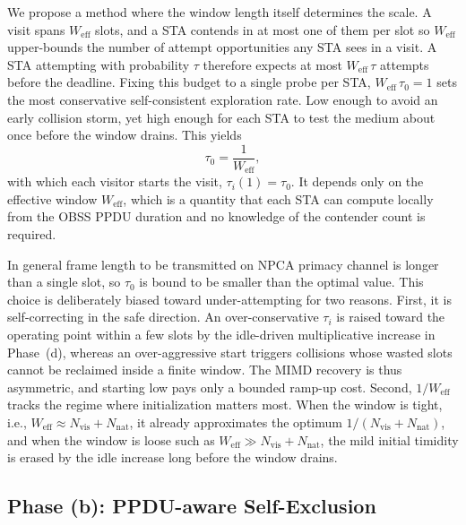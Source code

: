 \documentclass[conference]{IEEEtran}
\newcommand{\Nvis}{N_\mathrm{vis}}
\newcommand{\Nnat}{N_\mathrm{nat}}
\begin{document}
We propose a method where the window length itself determines the scale. A visit spans $W_\mathrm{eff}$ slots, and a STA contends in at most one of them per slot so $W_\mathrm{eff}$ upper-bounds the number of attempt opportunities any STA sees in a visit. A STA attempting with probability $\tau$ therefore expects at most $W_\mathrm{eff}\,\tau$ attempts before the deadline. Fixing this budget to a single probe per STA, $W_\mathrm{eff}\,\tau_0 = 1$ sets the most conservative self-consistent  exploration rate. Low enough to avoid an early collision storm, yet high enough for each STA to test the medium about once before the window drains. This yields
\begin{equation}
    \tau_0 = \frac{1}{W_\mathrm{eff}},
    \label{eq:init}
\end{equation}
with which each visitor starts the visit, $\tau_i(1)=\tau_0$. It depends only on the effective window $W_\mathrm{eff}$, which is a quantity that each STA can compute locally from the OBSS PPDU duration and no knowledge of the contender count is required.

In general frame length to be transmitted on NPCA primacy channel is longer than a single slot, so $\tau_0 $ is bound to be smaller than the optimal value. This choice is deliberately biased toward under-attempting for two reasons. First, it is self-correcting in the safe direction. An over-conservative $\tau_i$ is raised toward the operating point within a few slots by the idle-driven multiplicative increase in Phase~(d), whereas an over-aggressive start triggers collisions whose wasted slots cannot be reclaimed inside a finite window. The MIMD recovery is thus asymmetric, and starting low pays only a bounded ramp-up cost. Second, $1/W_\mathrm{eff}$ tracks the regime where initialization matters most. When the window is tight, i.e., $W_\mathrm{eff}\!\approx\!\Nvis{+}\Nnat$, it already approximates the optimum $1/(\Nvis{+}\Nnat)$, and when the window is loose such as $W_\mathrm{eff}\!\gg\!\Nvis{+}\Nnat$, the mild initial timidity is erased by the idle increase long before the window drains. 

\subsection{Phase (b): PPDU-aware Self-Exclusion}
\label{subsec:self_exclusion}
\end{document}
